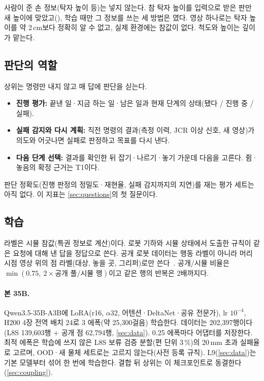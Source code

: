 사람이 준 손 정보(탁자 높이 등)는 넣지 않는다. 참 탁자 높이를 입력으로 받은 판만 새 높이에 맞았고(), 학습 때만 그 정보를 쓰는 세 방법은 였다. 영상 하나로는 탁자 높이를 약 2\,cm보다 정확히 알 수 없고, 실제 환경에는 참값이 없다. 척도와 높이는 깊이가 맡는다.

\subsection{판단의 역할}
상위는 명령만 내지 않고 매 답에 판단을 싣는다.
\begin{itemize}
  \item \textbf{진행 평가:} 끝낸 일·지금 하는 일·남은 일과 현재 단계의 상태(됐다 / 진행 중 / 실패).
  \item \textbf{실패 감지와 다시 계획:} 직전 명령의 결과(측정 이력, JCR 이상 신호, 새 영상)가 의도와 어긋나면 실패로 판정하고 목표를 다시 낸다.
  \item \textbf{다음 단계 선택:} 결과를 확인한 뒤 잡기·나르기·놓기 가운데 다음을 고른다. 쥠·놓음의 확정 근거는 T1이다.
\end{itemize}
판단 정확도(진행 판정의 정밀도·재현율, 실패 감지까지의 지연)를 재는 평가 세트는 아직 없다. 이 지표는 \cref{sec:questions}의 첫 질문이다.

\subsection{학습}
\label{sec:upper_train}
라벨은 시뮬 참값(특권 정보로 계산)이다. 로봇 기하와 시뮬 상태에서 도출한 규칙이 같은 요청에 대해 낸 답을 정답으로 쓴다. 공개 로봇 데이터는 행동 라벨이 아니라 머리 시점 영상 위의 점 라벨(대상, 놓을 곳, 그리퍼)로만 쓴다~\cite{molmoact2026}. 공개/시뮬 비율은 $\min(0.75,\ 2\times\text{공개 풀}/\text{시뮬 행})$이고 같은 행의 반복은 2배까지다.

\paragraph{본 35B.} Qwen3.5-35B-A3B에 LoRA(r16, $\alpha$32, 어텐션·DeltaNet·공유 전문가), lr $10^{-4}$, H200 4장 전역 배치 24로 3 에폭(약 25,300걸음) 학습한다. 데이터는 202,397행이다(L8S 139,603행 + 공개 점 62,794행, \cref{sec:data}). 0.25 에폭마다 어댑터를 저장한다. 최적 에폭은 학습에 쓰지 않은 L8S 보류 검증 분할(편 단위 3\,\%)의 20\,mm 초과 실패율로 고르며, OOD·새 물체 세트로는 고르지 않는다(사전 등록 규칙). L9(\cref{sec:data})는 기본 모델부터 섞어 한 번에 학습한다. 결합 뒤 상위는 이 체크포인트로 동결한다(\cref{sec:coupling}).
